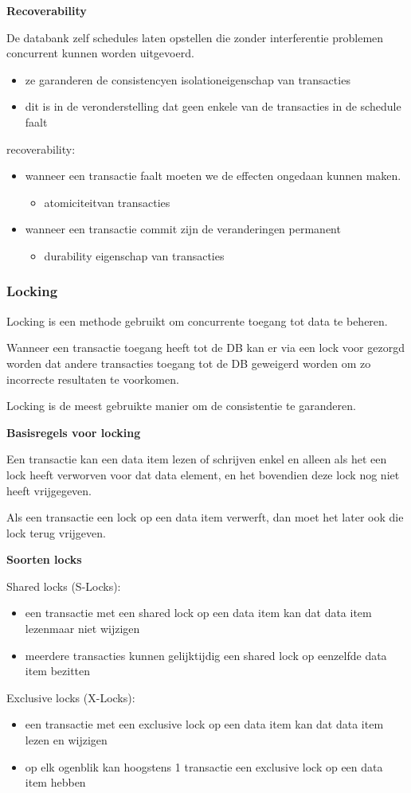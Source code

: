 \documentclass[a4paper,12pt]{article}
\begin{document}
\textbf{Recoverability}

De databank zelf schedules laten opstellen die zonder interferentie problemen concurrent kunnen worden uitgevoerd.
\begin{itemize}
\item ze garanderen de consistencyen isolationeigenschap van transacties
\item dit is in de veronderstelling dat geen enkele van de transacties in de schedule faalt
\end{itemize}
recoverability:
\begin{itemize}
\item wanneer een transactie faalt moeten we de effecten ongedaan kunnen maken.
	\begin{itemize}
	\item atomiciteitvan transacties
	\end{itemize}
\item wanneer een transactie commit zijn de veranderingen permanent
	\begin{itemize}
	\item durability eigenschap van transacties
	\end{itemize}
\end{itemize}

\subsubsection{Locking}
Locking is een methode gebruikt om concurrente toegang tot data te beheren.

Wanneer een transactie toegang heeft tot de DB kan er via een lock voor gezorgd worden dat andere transacties toegang tot de DB geweigerd worden om zo incorrecte resultaten te voorkomen.

Locking is de meest gebruikte manier om de consistentie te garanderen.

\textbf{Basisregels voor locking}

Een transactie kan een data item lezen of schrijven enkel en alleen als het een lock heeft verworven voor dat data element, en het bovendien deze lock nog niet heeft vrijgegeven.

Als een transactie een lock op een data item verwerft, dan moet het later ook die lock terug vrijgeven.

\textbf{Soorten locks}

Shared locks (S-Locks):
\begin{itemize}
\item een transactie met een shared lock op een data item kan dat data item lezenmaar niet wijzigen
\item meerdere transacties kunnen gelijktijdig een shared lock op eenzelfde data item bezitten
\end{itemize}
Exclusive locks (X-Locks):
\begin{itemize}
\item een transactie met een exclusive lock op een data item kan dat data item lezen en wijzigen
\item op elk ogenblik kan hoogstens 1 transactie een exclusive lock op een data item hebben
\end{itemize}
\end{document}
